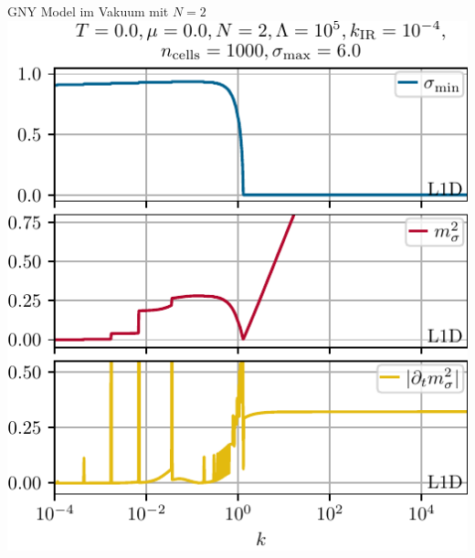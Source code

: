 \begin{frame}{GNY Model im Vakuum mit $N=2$}
	\includegraphics[width=0.47\framewidth]{../gn/figures/k_L1D_N=2,T=0.0,mu=0.0.pdf} 
\end{frame}


